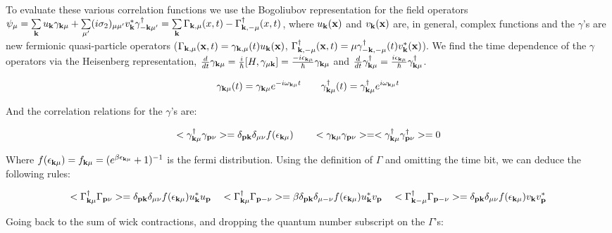 \documentclass[prb,showpacs,amssymb,amsmath,twocolumn]{revtex4-1}
\begin{document}
\begin{widetext}
To evaluate these various correlation functions we use the Bogoliubov representation for the field operators $\psi_\mu = \sum\limits_{{\bf k}}u_{\bf k} \gamma_{{\bf k} \mu} + \sum\limits_{\mu'}(i\sigma_2)_{\mu\mu'} v_{\bf k}^* \gamma^\dag_{-{\bf k} \mu'}=\sum\limits_{\bf k} \Gamma_{{\bf k},\mu}(x,t)-\Gamma_{{\bf k},-\mu}^\dagger(x,t)$, where $u_{\bf k}({\bf x})$ and $v_{\bf k}({\bf x})$ are, in general, complex functions and the $\gamma$'s are new fermionic quasi-particle operators ($\Gamma_{{\bf k},\mu}({\bf x},t)=\gamma_{{\bf k},\mu}(t)u_{\bf k}({\bf x})$, $\Gamma_{{\bf k},-\mu}^\dagger({\bf x},t)=\mu\gamma_{-{\bf k},-\mu}^\dagger(t)v^*_{{\bf k}}({\bf x})$). We find the time dependence of the $\gamma$ operators via the Heisenberg representation, $\frac{d}{dt}\gamma_{{\bf k}\mu}=\frac{i}{\hbar}[H,\gamma_{\mu{\bf k}}]=\frac{-i\epsilon_{{\bf k}\mu}}{\hbar}\gamma_{{\bf k}\mu}$ and $\frac{d}{dt}\gamma^\dagger_{{\bf k}\mu}=\frac{i\epsilon_{{\bf k}\mu}}{\hbar}\gamma^\dagger_{{\bf k}\mu}$.

\begin{equation*}
\gamma_{{\bf k}\mu}(t)=\gamma_{{\bf k}\mu}e^{-i\omega_{{\bf k}\mu}t}\quad\quad \gamma^\dagger_{{\bf k}\mu}(t)=\gamma^\dagger_{{\bf k}\mu}e^{i\omega_{{\bf k}\mu}t}
\end{equation*}

And the correlation relations for the $\gamma$'s are:

\begin{equation*}
<\gamma^\dagger_{{\bf k}\mu}\gamma_{{\bf p}\nu}>=\delta_{{\bf p}{\bf k}}\delta_{\mu\nu}f(\epsilon_{{\bf k}\mu}) \quad\quad <\gamma_{{\bf k}\mu}\gamma_{{\bf p}\nu}>=<\gamma^\dagger_{{\bf k}\mu}\gamma^\dagger_{{\bf p}\nu}>=0
\end{equation*}

Where $f(\epsilon_{{\bf k}\mu})=f_{{\bf k}\mu}=(e^{\beta{\epsilon_{{\bf k}\mu}}}+1)^{-1}$ is the fermi distribution. Using the definition of $\Gamma$ and omitting the time bit, we can deduce the following rules:

\begin{equation*}
<\Gamma^\dagger_{{\bf k}\mu}\Gamma_{{\bf p}\nu}>=\delta_{{\bf p}{\bf k}}\delta_{\mu\nu}f(\epsilon_{{\bf k}\mu})u^*_{\bf k} u_{\bf p} \quad <\Gamma^\dagger_{{\bf k}\mu}\Gamma_{{\bf p}-\nu}>=\beta\delta_{{\bf p}{\bf k}}\delta_{\mu -\nu}f(\epsilon_{{\bf k}\mu})u^*_{\bf k} v_{\bf p} \quad <\Gamma^\dagger_{{\bf k}-\mu}\Gamma_{{\bf p}-\nu}>=\delta_{{\bf p}{\bf k}}\delta_{\mu\nu}f(\epsilon_{{\bf k}\mu})v_{\bf k} v^*_{\bf p}
\end{equation*}

Going back to the sum of wick contractions, and dropping the quantum number subscript on the $\Gamma$'s:


\end{widetext}
\end{document}
